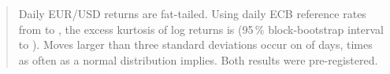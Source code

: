 \begin{abstract}
Daily EUR/USD returns are fat-tailed. Using  daily ECB reference
rates from  to , the excess kurtosis of log returns is
 (95\,\% block-bootstrap interval  to
). Moves larger than three standard deviations occur on
 of days,  times as often as a normal distribution
implies. Both results were pre-registered.
\end{abstract}
